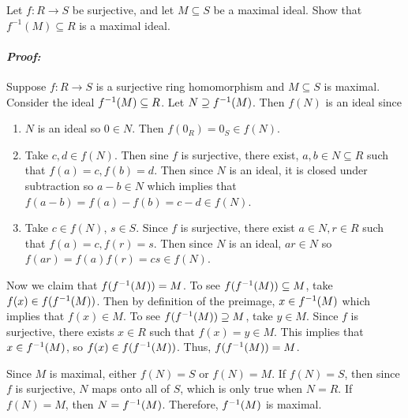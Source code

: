 \documentclass [12pt] {article}
\renewcommand{\it}[1]{\textit{{#1}}}
\newenvironment{problem}{\begin{tcolorbox}[title=Problem,colback=black!5!white,colframe=black!75!black]}{\end{tcolorbox}}
\newenvironment{response}{\begin{responseframe}\vspace{-10pt}\paragraph{\it{Proof:}}}{\end{responseframe}}
\begin{document}
\begin{problem}
    Let $f:R\to S$ be surjective, and let $M\subseteq S$ be a maximal ideal. Show
    that $f^{-1}(M)\subseteq R$ is a maximal ideal.
\end{problem}
\begin{response}
    Suppose $f : R\to S$ is a surjective ring homomorphism and $M\subseteq S$ is
    maximal. Consider the ideal $f^{-1}(M)\subseteq R$. Let $N\supseteq f^{-1}(M)$.
    Then $f(N)$ is an ideal since
    \begin{enumerate}[label=(\arabic*)]
        \item $N$ is an ideal so $0\in N$. Then $f(0_R)=0_S\in f(N)$.
        \item Take $c,d\in f(N)$. Then sine $f$ is surjective, there exist,
            $a,b\in N\subseteq R$ such that $f(a)=c,f(b)=d$. Then since $N$ is
            an ideal, it is closed under subtraction so $a-b\in N$ which implies
            that $f(a-b)=f(a)-f(b)=c-d\in f(N)$.
        \item Take $c\in f(N)$, $s\in S$. Since $f$ is surjective, there exist
            $a\in N,r\in R$ such that $f(a)=c,f(r)=s$. Then since $N$ is an
            ideal, $ar\in N$ so $f(ar)=f(a)f(r)=cs\in f(N)$.
    \end{enumerate}
    Now we claim that $f(f^{-1}(M))=M$. To see $f(f^{-1}(M))\subseteq M$, take
    $f(x)\in f(f^{-1}(M))$. Then by definition of the preimage, $x\in f^{-1}(M)$
    which implies that $f(x)\in M$. To see $f(f^{-1}(M))\supseteq M$, take
    $y\in M$. Since $f$ is surjective, there exists $x\in R$ such that
    $f(x)=y\in M$. This implies that $x\in f^{-1}(M)$, so $f(x)\in f(f^{-1}(M))$.
    Thus, $f(f^{-1}(M))=M$.
    \vspace{1em}

    Since $M$ is maximal, either $f(N)=S$ or $f(N)=M$. If $f(N)=S$, then since
    $f$ is surjective, $N$ maps onto all of $S$, which is only true when $N=R$.
    If $f(N)=M$, then $N=f^{-1}(M)$. Therefore, $f^{-1}(M)$ is maximal.
\end{response}
\end{document}
